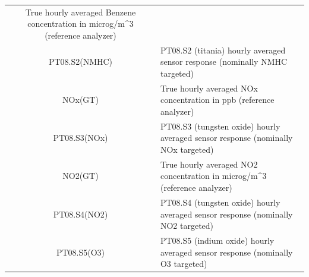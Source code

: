 \documentclass[]{article}
\begin{document}
\begin{longtable}[]{@{}cl@{}}
\begin{minipage}[t]{0.79\columnwidth}
True hourly averaged Benzene concentration in microg/m\^{}3 (reference
analyzer)\strut
\end{minipage}\tabularnewline
\begin{minipage}[t]{0.15\columnwidth}\centering\strut
PT08.S2(NMHC)\strut
\end{minipage} & \begin{minipage}[t]{0.79\columnwidth}\raggedright\strut
PT08.S2 (titania) hourly averaged sensor response (nominally NMHC
targeted)\strut
\end{minipage}\tabularnewline
\begin{minipage}[t]{0.15\columnwidth}\centering\strut
NOx(GT)\strut
\end{minipage} & \begin{minipage}[t]{0.79\columnwidth}\raggedright\strut
True hourly averaged NOx concentration in ppb (reference analyzer)\strut
\end{minipage}\tabularnewline
\begin{minipage}[t]{0.15\columnwidth}\centering\strut
PT08.S3(NOx)\strut
\end{minipage} & \begin{minipage}[t]{0.79\columnwidth}\raggedright\strut
PT08.S3 (tungsten oxide) hourly averaged sensor response (nominally NOx
targeted)\strut
\end{minipage}\tabularnewline
\begin{minipage}[t]{0.15\columnwidth}\centering\strut
NO2(GT)\strut
\end{minipage} & \begin{minipage}[t]{0.79\columnwidth}\raggedright\strut
True hourly averaged NO2 concentration in microg/m\^{}3 (reference
analyzer)\strut
\end{minipage}\tabularnewline
\begin{minipage}[t]{0.15\columnwidth}\centering\strut
PT08.S4(NO2)\strut
\end{minipage} & \begin{minipage}[t]{0.79\columnwidth}\raggedright\strut
PT08.S4 (tungsten oxide) hourly averaged sensor response (nominally NO2
targeted)\strut
\end{minipage}\tabularnewline
\begin{minipage}[t]{0.15\columnwidth}\centering\strut
PT08.S5(O3)\strut
\end{minipage} & \begin{minipage}[t]{0.79\columnwidth}\raggedright\strut
PT08.S5 (indium oxide) hourly averaged sensor response (nominally O3
targeted)\strut
\end{minipage}\tabularnewline

\end{longtable}
\end{document}
